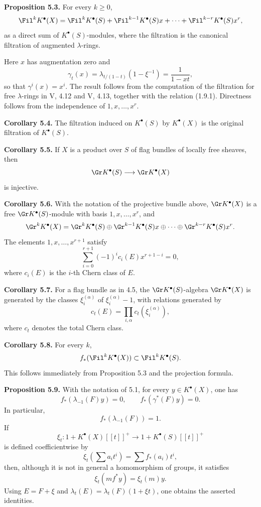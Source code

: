 \textbf{Proposition 5.3.} For every \(k\geq 0\),
\[
  \Fil^k K^\bullet(X)
  =
  \Fil^k K^\bullet(S)
  +\Fil^{k-1}K^\bullet(S)x+\cdots+\Fil^{k-r}K^\bullet(S)x^r,
\]
as a direct sum of \(K^\bullet(S)\)-modules, where the filtration is the canonical filtration of augmented \(\lambda\)-rings.

Here \(x\) has augmentation zero and
\[
  \gamma_t(x)=\lambda_{t/(1-t)}(1-\xi^{-1})=\frac{1}{1-xt},
\]
so that \(\gamma^i(x)=x^i\). The result follows from the computation of the filtration for free \(\lambda\)-rings in V, 4.12 and V, 4.13, together with the relation (1.9.1). Directness follows from the independence of \(1,x,\ldots,x^r\).

\textbf{Corollary 5.4.} The filtration induced on \(K^\bullet(S)\) by \(K^\bullet(X)\) is the original filtration of \(K^\bullet(S)\).

\textbf{Corollary 5.5.} If \(X\) is a product over \(S\) of flag bundles of locally free sheaves, then
\[
  \Gr K^\bullet(S)\longrightarrow \Gr K^\bullet(X)
\]
is injective.

\textbf{Corollary 5.6.} With the notation of the projective bundle above, \(\Gr K^\bullet(X)\) is a free \(\Gr K^\bullet(S)\)-module with basis \(1,x,\ldots,x^r\), and
\[
  \Gr^k K^\bullet(X)
  =\Gr^kK^\bullet(S)\oplus\Gr^{k-1}K^\bullet(S)x\oplus\cdots\oplus\Gr^{k-r}K^\bullet(S)x^r.
\]
The elements \(1,x,\ldots,x^{r+1}\) satisfy
\[
  \sum_{i=0}^{r+1}(-1)^i c_i(E)x^{r+1-i}=0,
\]
where \(c_i(E)\) is the \(i\)-th Chern class of \(E\).

\textbf{Corollary 5.7.} For a flag bundle as in 4.5, the \(\Gr K^\bullet(S)\)-algebra \(\Gr K^\bullet(X)\) is generated by the classes \(\xi_i^{(\alpha)}\) of \(\xi_i^{(\alpha)}-1\), with relations generated by
\[
  c_t(E)=\prod_{i,\alpha}c_t(\xi_i^{(\alpha)}),
\]
where \(c_t\) denotes the total Chern class.

\textbf{Corollary 5.8.} For every \(k\),
\[
  f_*(\Fil^k K^\bullet(X))\subset \Fil^k K^\bullet(S).
\]
This follows immediately from Proposition 5.3 and the projection formula.

\textbf{Proposition 5.9.} With the notation of 5.1, for every \(y\in K^\bullet(X)\), one has
\[
  f_*(\lambda_{-1}(F)y)=0,
  \qquad
  f_*(\gamma^*(F)y)=0.
\]
In particular,
\[
  f_*(\lambda_{-1}(F))=1.
\]
If
\[
  \xi_t:1+K^\bullet(X)[[t]]^+\longrightarrow 1+K^\bullet(S)[[t]]^+
\]
is defined coefficientwise by
\[
  \xi_t\left(\sum a_i t^i\right)=\sum f_*(a_i)t^i,
\]
then, although it is not in general a homomorphism of groups, it satisfies
\[
  \xi_t(mf^*y)=\xi_t(m)y.
\]
Using \(E=F+\xi\) and \(\lambda_t(E)=\lambda_t(F)(1+\xi t)\), one obtains the asserted identities.

